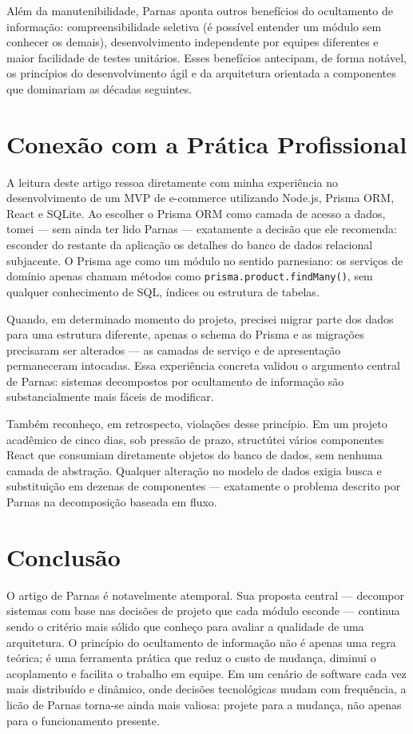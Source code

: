 \documentclass[12pt,a4paper]{article}
\begin{document}
Al\'em da manutenibilidade, Parnas aponta outros benef\'icios do ocultamento de
informa\c{c}\~ao: compreensibilidade seletiva (\'e poss\'ivel entender um m\'odulo
sem conhecer os demais), desenvolvimento independente por equipes diferentes e
maior facilidade de testes unit\'arios. Esses benef\'icios antecipam, de forma
not\'avel, os princ\'ipios do desenvolvimento \'agil e da arquitetura orientada a
componentes que dominariam as d\'ecadas seguintes.

\section{Conex\~ao com a Pr\'atica Profissional}

A leitura deste artigo ressoa diretamente com minha experi\^encia no desenvolvimento
de um MVP de e-commerce utilizando Node.js, Prisma ORM, React e SQLite. Ao
escolher o Prisma ORM como camada de acesso a dados, tomei --- sem ainda ter
lido Parnas --- exatamente a decis\~ao que ele recomenda: esconder do restante da
aplica\c{c}\~ao os detalhes do banco de dados relacional subjacente. O Prisma age
como um m\'odulo no sentido parnesiano: os servi\c{c}os de dom\'inio apenas chamam
m\'etodos como \texttt{prisma.product.findMany()}, sem qualquer conhecimento de
SQL, \'indices ou estrutura de tabelas.

Quando, em determinado momento do projeto, precisei migrar parte dos dados para
uma estrutura diferente, apenas o schema do Prisma e as migra\c{c}\~oes precisaram
ser alterados --- as camadas de servi\c{c}o e de apresenta\c{c}\~ao permaneceram
intocadas. Essa experi\^encia concreta validou o argumento central de Parnas:
sistemas decompostos por ocultamento de informa\c{c}\~ao s\~ao substancialmente
mais f\'aceis de modificar.

Tamb\'em reconhe\c{c}o, em retrospecto, viola\c{c}\~oes desse princ\'ipio. Em um
projeto acad\^emico de cinco dias, sob press\~ao de prazo, struct\'utei v\'arios
componentes React que consumiam diretamente objetos do banco de dados, sem nenhuma
camada de abstra\c{c}\~ao. Qualquer altera\c{c}\~ao no modelo de dados exigia
busca e substitui\c{c}\~ao em dezenas de componentes --- exatamente o problema
descrito por Parnas na decomposi\c{c}\~ao baseada em fluxo.

\section{Conclus\~ao}

O artigo de Parnas \'e notavelmente atemporal. Sua proposta central --- decompor
sistemas com base nas decis\~oes de projeto que cada m\'odulo esconde --- continua
sendo o crit\'erio mais s\'olido que conhe\c{c}o para avaliar a qualidade de uma
arquitetura. O princ\'ipio do ocultamento de informa\c{c}\~ao n\~ao \'e apenas
uma regra te\'orica; \'e uma ferramenta pr\'atica que reduz o custo de mudan\c{c}a,
diminui o acoplamento e facilita o trabalho em equipe. Em um cen\'ario de software
cada vez mais distribu\'ido e din\^amico, onde decis\~oes tecnol\'ogicas mudam com
frequ\^encia, a lic\~ao de Parnas torna-se ainda mais valiosa: projete para a
mudan\c{c}a, n\~ao apenas para o funcionamento presente.
\end{document}

